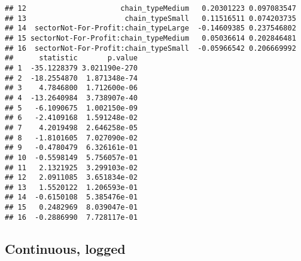 \documentclass[]{article}
\newenvironment{Shaded}{\begin{snugshade}}{\end{snugshade}}
\newcommand{\KeywordTok}[1]{\textcolor[rgb]{0.13,0.29,0.53}{\textbf{{#1}}}}
\newcommand{\DataTypeTok}[1]{\textcolor[rgb]{0.13,0.29,0.53}{{#1}}}
\newcommand{\StringTok}[1]{\textcolor[rgb]{0.31,0.60,0.02}{{#1}}}
\newcommand{\OtherTok}[1]{\textcolor[rgb]{0.56,0.35,0.01}{{#1}}}
\newcommand{\NormalTok}[1]{{#1}}
\begin{document}
\begin{verbatim}
## 12                      chain_typeMedium   0.20301223 0.097083547
## 13                       chain_typeSmall   0.11516511 0.074203735
## 14  sectorNot-For-Profit:chain_typeLarge  -0.14609385 0.237546802
## 15 sectorNot-For-Profit:chain_typeMedium   0.05036614 0.202846481
## 16  sectorNot-For-Profit:chain_typeSmall  -0.05966542 0.206669992
##      statistic       p.value
## 1  -35.1228379 3.021190e-270
## 2  -18.2554870  1.871348e-74
## 3    4.7846800  1.712600e-06
## 4  -13.2640984  3.738907e-40
## 5   -6.1090675  1.002150e-09
## 6   -2.4109168  1.591248e-02
## 7    4.2019498  2.646258e-05
## 8   -1.8101605  7.027090e-02
## 9   -0.4780479  6.326161e-01
## 10  -0.5598149  5.756057e-01
## 11   2.1321925  3.299103e-02
## 12   2.0911085  3.651834e-02
## 13   1.5520122  1.206593e-01
## 14  -0.6150108  5.385476e-01
## 15   0.2482969  8.039047e-01
## 16  -0.2886990  7.728117e-01
\end{verbatim}

\subsection{Continuous, logged}\label{continuous-logged}

\begin{Shaded}
\end{Shaded}
\end{document}
